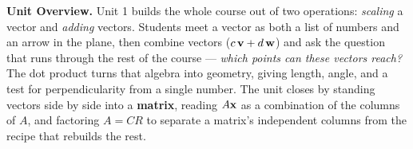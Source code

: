 %
%
\pagestyle{empty}


\vspace*{1.32in}

\begin{tcolorbox}[colback=blush,colframe=burgundy,boxrule=0.9pt,arc=2mm,
    left=4mm,right=4mm,top=3mm,bottom=3mm]
  \textbf{Unit Overview.}\quad
  Unit 1 builds the whole course out of two operations: \emph{scaling} a vector and
  \emph{adding} vectors. Students meet a vector as both a list of numbers and an arrow in
  the plane, then combine vectors ($c\,\mathbf{v} + d\,\mathbf{w}$) and ask the question that runs through
  the rest of the course --- \emph{which points can these vectors reach?} The dot product
  turns that algebra into geometry, giving length, angle, and a test for perpendicularity
  from a single number. The unit closes by standing vectors side by side into a
  \textbf{matrix}, reading $A\mathbf{x}$ as a combination of the columns of $A$, and factoring
  $A = CR$ to separate a matrix's independent columns from the recipe that rebuilds the rest.
\end{tcolorbox}

